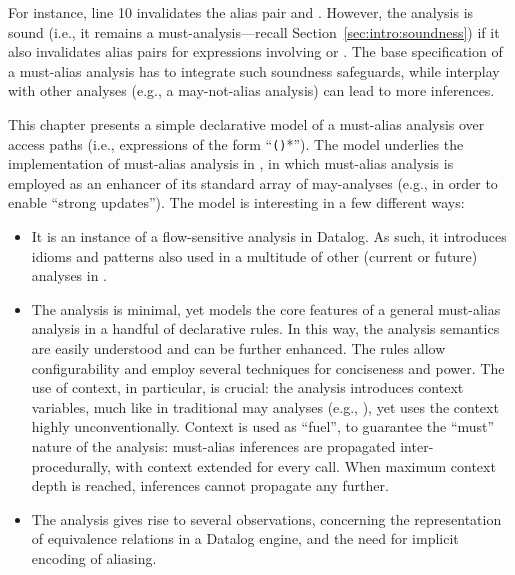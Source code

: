For instance, line 10 invalidates the alias pair  and . However, the analysis is sound (i.e., it remains a must-analysis---recall Section~\ref{sec:intro:soundness}) if it also invalidates alias pairs for expressions involving  or . The base specification of a must-alias analysis has to integrate such soundness safeguards, while interplay with other analyses (e.g., a may-not-alias analysis) can lead to more inferences.

This chapter presents a simple declarative model of a must-alias analysis over access paths (i.e., expressions of the form ``\texttt{()}*''). The model underlies the implementation of must-alias analysis in \doop{}, in which must-alias analysis is employed as an enhancer of its standard array of may-analyses (e.g., in order to enable ``strong updates''). The model is interesting in a few different ways:

\begin{itemize}
\item It is an instance of a flow-sensitive analysis in Datalog. As such, it introduces idioms and patterns also used in a multitude of other (current or future) analyses in \doop{}.

\item The analysis is minimal, yet models the core features of a general must-alias analysis in a handful of declarative rules. In this way, the analysis semantics are easily understood and can be further enhanced. The rules allow configurability and employ several techniques for conciseness and power. The use of context, in particular, is crucial: the analysis introduces context variables, much like in traditional may analyses (e.g., \cite{pldi:2013:Kastrinis,article:2015:Smaragdakis}), yet uses the context highly unconventionally. Context is used as ``fuel'', to guarantee the ``must'' nature of the analysis: must-alias inferences are propagated inter-procedurally, with context extended for every call. When maximum context depth is reached, inferences cannot propagate any further.

\item The analysis gives rise to several observations, concerning the representation of equivalence relations in a Datalog engine, and the need for implicit encoding of aliasing.
\end{itemize}


